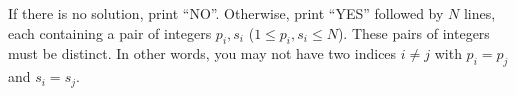 

If there is no solution, print ``NO''. Otherwise, print ``YES'' followed by $N$ lines, 
each containing a pair of integers $p_i, s_i$ ($1 \leq p_i, s_i \leq N$). These pairs 
of integers must be distinct. In other words, you may not have two indices $i \neq j$
with $p_i = p_j$ and $s_i = s_j$.
